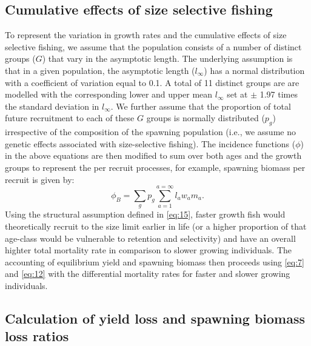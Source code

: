 \documentclass[12pt]{article}
\begin{document}
\subsection{Cumulative effects of size selective fishing} %
\label{sub:cumulative_effects_of_size_selective_fishing}
To represent the variation in growth rates and the cumulative effects of size selective fishing, we assume that the population consists of a number of distinct groups ($G$) that vary in the asymptotic length.  The underlying assumption is that in a given population, the asymptotic length ($l_\infty$) has a normal distribution with a coefficient of variation equal to 0.1.  A total of 11 distinct groups are are modelled with the corresponding lower and upper mean $l_\infty$ set at $\pm$ 1.97 times the standard deviation in $l_\infty$.  We further assume that the proportion of total future recruitment to each of these $G$ groups is normally distributed ($p_g$) irrespective of the composition of the spawning population (i.e., we assume no genetic effects associated with size-selective fishing).  The incidence functions ($\phi$) in the above equations are then modified to sum over both ages and the growth groups to represent the per recruit processes, for example, spawning biomass per recruit is given by:
\begin{equation}\label{eq:15}
	\phi_B = \sum_g p_g \sum_{a=1}^{a=\infty} l_a w_a m_a.
\end{equation}
Using the structural assumption defined in \eqref{eq:15}, faster growth fish would theoretically recruit to the size limit earlier in life (or a higher proportion of that age-class would be vulnerable to retention and selectivity) and have an overall highter total mortality rate in comparison to slower growing individuals.  The accounting of equilibrium yield and spawning biomass then proceeds using \eqref{eq:7} and \eqref{eq:12} with the differential mortality rates for faster and slower growing individuals.


\subsection{Calculation of yield loss and spawning biomass loss ratios} %
\label{sub:calculation_of_yield_loss_and_spawning_biomass_loss_ratios}
\end{document}
